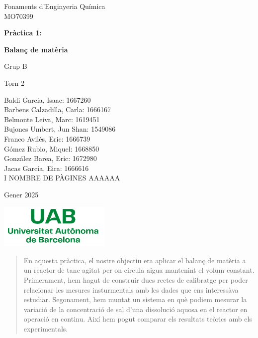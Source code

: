 \documentclass[10pt, twoside]{article}
\begin{document}
\begin{titlepage}
\centering
{\Large Fonaments d'Enginyeria Química \\ MO70399 \par}
\vspace{2cm}
{\Huge \textbf{Pràctica 1:} \par}
\vspace{1cm}
{\Huge \textbf{Balanç de matèria} \par}
\vspace{1cm}
{\Large Grup B \par}
\vspace{0.5cm}
{\Large Torn 2 \par}
\vspace{0.5cm}
{\normalsize Baldi Garcia, Isaac: 1667260 \\ Barbens Calzadilla, Carla: 1666167 \\ Belmonte Leiva, Marc: 1619451 \\ Bujones Umbert, Jun Shan: 1549086 \\ Franco Avilés, Eric: 1666739 \\ Gómez Rubio, Miquel: 1668850 \\ González Barea, Eric: 1672980 \\ Jacas García, Eira: 1666616 \\ I NOMBRE DE PÀGINES AAAAAA\par}
\vspace{1cm}
{\Large Gener 2025 \par}
\vspace{2cm}
\includegraphics[width=0.4\textwidth]{Logo_UAB.png}

\end{titlepage}

\renewcommand{\cftsecfont}{}
\renewcommand{\cftsecpagefont}{}
\renewcommand{\cftsecleader}{\cftdotfill{\cftdotsep}}
\renewcommand{\cftdotsep}{0.2}
\setlength{\cftbeforesecskip}{0.5em}
\setlength{\cftbeforesubsecskip}{0.5em}
\tableofcontents

\newpage
{}
\setcounter{page}{1}

\pagestyle{fancy}

\begin{abstract}
En aquesta pràctica, el nostre objectiu era aplicar el balanç de matèria a un reactor de tanc agitat per on circula aigua mantenint el volum constant. Primerament, hem hagut de construir dues rectes de calibratge per poder relacionar les mesures insturmentals amb les dades que ens interessàva estudiar. Segonament, hem muntat un sistema en què podiem mesurar la variació de la concentració de sal d'una dissolució aquosa en el reactor en operació en continu. Així hem pogut comparar els resultats teòrics amb els experimentals.
\end{abstract}
\end{document}
